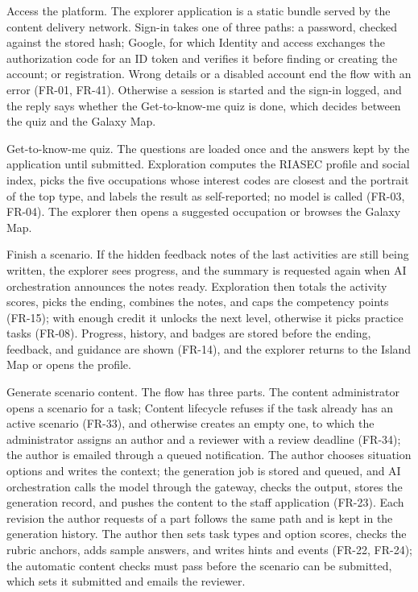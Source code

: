 Access the platform. The explorer application is a static bundle served by the content delivery network. Sign-in takes one of three paths: a password, checked against the stored hash; Google, for which Identity and access exchanges the authorization code for an ID token and verifies it before finding or creating the account; or registration. Wrong details or a disabled account end the flow with an error (FR-01, FR-41). Otherwise a session is started and the sign-in logged, and the reply says whether the Get-\allowbreak{}to-\allowbreak{}know-\allowbreak{}me quiz is done, which decides between the quiz and the Galaxy Map.

Get-\allowbreak{}to-\allowbreak{}know-\allowbreak{}me quiz. The questions are loaded once and the answers kept by the application until submitted. Exploration computes the RIASEC profile and social index, picks the five occupations whose interest codes are closest and the portrait of the top type, and labels the result as self-\allowbreak{}reported; no model is called (FR-03, FR-04). The explorer then opens a suggested occupation or browses the Galaxy Map.

Finish a scenario. If the hidden feedback notes of the last activities are still being written, the explorer sees progress, and the summary is requested again when AI orchestration announces the notes ready. Exploration then totals the activity scores, picks the ending, combines the notes, and caps the competency points (FR-15); with enough credit it unlocks the next level, otherwise it picks practice tasks (FR-08). Progress, history, and badges are stored before the ending, feedback, and guidance are shown (FR-14), and the explorer returns to the Island Map or opens the profile.

Generate scenario content. The flow has three parts. The content administrator opens a scenario for a task; Content lifecycle refuses if the task already has an active scenario (FR-33), and otherwise creates an empty one, to which the administrator assigns an author and a reviewer with a review deadline (FR-34); the author is emailed through a queued notification. The author chooses situation options and writes the context; the generation job is stored and queued, and AI orchestration calls the model through the gateway, checks the output, stores the generation record, and pushes the content to the staff application (FR-23). Each revision the author requests of a part follows the same path and is kept in the generation history. The author then sets task types and option scores, checks the rubric anchors, adds sample answers, and writes hints and events (FR-22, FR-24); the automatic content checks must pass before the scenario can be submitted, which sets it submitted and emails the reviewer.

